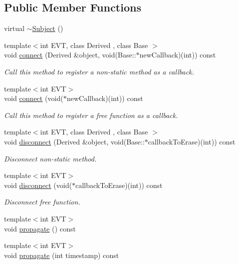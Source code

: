 \subsection*{Public Member Functions}
\begin{DoxyCompactItemize}
\item 
virtual \hyperlink{classocra_1_1Subject_a4189b52b5d0a5b53d43e7a0f97a02fd7}{$\sim$\+Subject} ()
\item 
{\footnotesize template$<$int E\+VT, class Derived , class Base $>$ }\\void \hyperlink{classocra_1_1Subject_acf73b4aa6f6040953e6705a6ab1c95bf}{connect} (Derived \&object, void(Base\+::$\ast$new\+Callback)(int)) const 
\begin{DoxyCompactList}\small\item\em Call this method to register a non-\/static method as a callback. \end{DoxyCompactList}\item 
{\footnotesize template$<$int E\+VT$>$ }\\void \hyperlink{classocra_1_1Subject_a45ecfbe5bd7db03ed1d6a2267f913863}{connect} (void($\ast$new\+Callback)(int)) const 
\begin{DoxyCompactList}\small\item\em Call this method to register a free function as a callback. \end{DoxyCompactList}\item 
{\footnotesize template$<$int E\+VT, class Derived , class Base $>$ }\\void \hyperlink{classocra_1_1Subject_a3127f3cf06b90277f16c71713a994f9e}{disconnect} (Derived \&object, void(Base\+::$\ast$callback\+To\+Erase)(int)) const 
\begin{DoxyCompactList}\small\item\em Disconnect non-\/static method. \end{DoxyCompactList}\item 
{\footnotesize template$<$int E\+VT$>$ }\\void \hyperlink{classocra_1_1Subject_a42f2ef47680082c69d12272b23019023}{disconnect} (void($\ast$callback\+To\+Erase)(int)) const 
\begin{DoxyCompactList}\small\item\em Disconnect free function. \end{DoxyCompactList}\item 
{\footnotesize template$<$int E\+VT$>$ }\\void \hyperlink{classocra_1_1Subject_af2443af5183ce9bf5a7be9504f6401fe}{propagate} () const 
\item 
{\footnotesize template$<$int E\+VT$>$ }\\void \hyperlink{classocra_1_1Subject_aa566bb35774471c2d7a059dcbee19099}{propagate} (int timestamp) const 
\end{DoxyCompactItemize}
